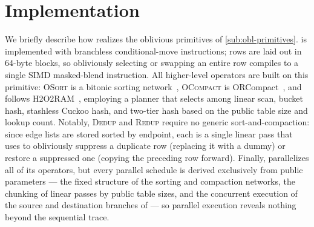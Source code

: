 \section{Implementation}
\label{sec:implementation}

We briefly describe how \system realizes the oblivious primitives of
\cref{sub:obl-primitives}. \cmpset is implemented with branchless
conditional-move instructions; rows are laid out in 64-byte blocks, so
obliviously selecting or swapping an entire row compiles to a single SIMD
masked-blend instruction. All higher-level operators are built on this
primitive: \textsc{OSort} is a bitonic sorting
network~\cite{batcher1968sorting}, \textsc{OCompact} is
ORCompact~\cite{sasy2022fast}, and \oht follows
H2O2RAM~\cite{zheng2025h2o2ram}, employing a planner that selects among
linear scan, bucket hash, stashless Cuckoo hash, and two-tier hash based on
the public table size and lookup count. Notably, \textsc{Dedup} and
\textsc{Redup} require no generic sort-and-compaction: since edge lists are
stored sorted by endpoint, each is a single linear pass that uses \cmpset
to obliviously suppress a duplicate row (replacing it with a dummy) or
restore a suppressed one (copying the preceding row forward). Finally,
\system parallelizes all of its operators, but every parallel schedule is
derived exclusively from public parameters --- the fixed structure of the
sorting and compaction networks, the chunking of linear passes by public
table sizes, and the concurrent execution of the source and destination
branches of \onehop --- so parallel execution reveals nothing beyond the
sequential trace.
